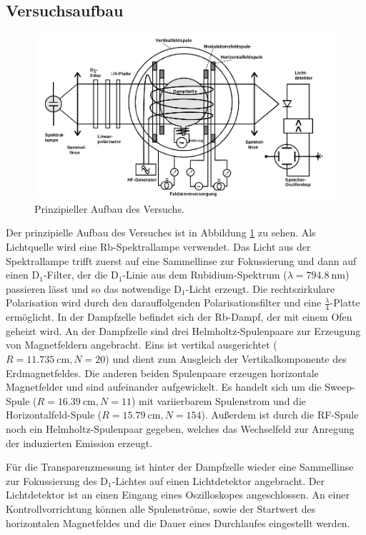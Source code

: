 \subsection{Versuchsaufbau}
\label{sec:Versuchsaufbau}
\begin{figure}
  \centering
  \includegraphics[width=0.9\columnwidth]{pictures/aufbau.png}
  \caption{Prinzipieller Aufbau des Versuchs.\cite{Anleitung}}
  \label{fig:aufbau}
\end{figure}

Der prinzipielle Aufbau des Versuches ist in Abbildung \ref{fig:aufbau}
zu sehen.
Als Lichtquelle wird eine Rb-Spektrallampe verwendet.
Das Licht aus der Spektrallampe trifft zuerst auf eine Sammellinse
zur Fokussierung und dann auf einen
D$_1$-Filter, der die D$_1$-Linie aus dem Rubidium-Spektrum
($\lambda = \SI{794,8}{\nano\meter}$) passieren lässt und so das
notwendige D$_1$-Licht erzeugt. Die rechtszirkulare Polarisation
wird durch den darauffolgenden Polarisationsfilter und eine $\frac{\lambda}{4}$-Platte ermöglicht.
In der Dampfzelle befindet sich der Rb-Dampf, der mit einem Ofen geheizt
wird. An der Dampfzelle sind drei Helmholtz-Spulenpaare zur Erzeugung von
Magnetfeldern angebracht. Eins ist vertikal ausgerichtet
($R=\SI{11,735}{\centi\meter}, N=20$) und dient
zum Ausgleich der Vertikalkomponente des Erdmagnetfeldes.
Die anderen beiden Spulenpaare erzeugen horizontale Magnetfelder und sind
aufeinander aufgewickelt. Es handelt sich um die Sweep-Spule ($R=\SI{16,39}{\centi\meter}, N=11$) mit variierbarem Spulenstrom und die
Horizontalfeld-Spule ($R=\SI{15,79}{\centi\meter}, N=154$).
Außerdem ist durch die RF-Spule noch ein Helmholtz-Spulenpaar gegeben, welches das
Wechselfeld zur Anregung der induzierten Emission erzeugt.

Für die Transparenzmessung ist hinter der Dampfzelle wieder eine Sammellinse zur Fokussierung
des D$_1$-Lichtes auf einen Lichtdetektor angebracht. Der Lichtdetektor ist an einen Eingang
eines Oszilloskopes angeschlossen.
An einer Kontrollvorrichtung können alle Spulenströme, sowie der Startwert des horizontalen
Magnetfeldes und die Dauer eines Durchlaufes eingestellt werden.
